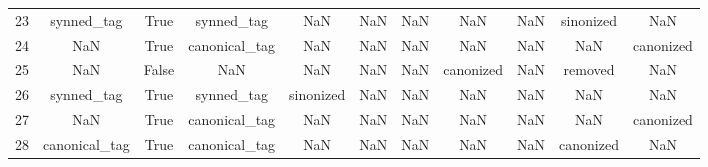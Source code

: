 \begin{table}[h!]
{\begin{tabular}{|c|c|c|c|c|c|c|c|c|c|c|}
         23 &                synned\_tag &                              True &                   synned\_tag &                                  NaN &                                  NaN &                                  NaN &                                  NaN &                                  NaN &                            sinonized &                                                NaN \\
         24 &                       NaN &                              True &                canonical\_tag &                                  NaN &                                  NaN &                                  NaN &                                  NaN &                                  NaN &                                  NaN &                                          canonized \\
         25 &                       NaN &                             False &                          NaN &                                  NaN &                                  NaN &                                  NaN &                            canonized &                                  NaN &                              removed &                                                NaN \\
         26 &                synned\_tag &                              True &                   synned\_tag &                            sinonized &                                  NaN &                                  NaN &                                  NaN &                                  NaN &                                  NaN &                                                NaN \\
         27 &                       NaN &                              True &                canonical\_tag &                                  NaN &                                  NaN &                                  NaN &                                  NaN &                                  NaN &                                  NaN &                                          canonized \\
         28 &             canonical\_tag &                              True &                canonical\_tag &                                  NaN &                                  NaN &                                  NaN &                                  NaN &                                  NaN &                            canonized &                                                NaN \\

\end{tabular}}
\end{table}
